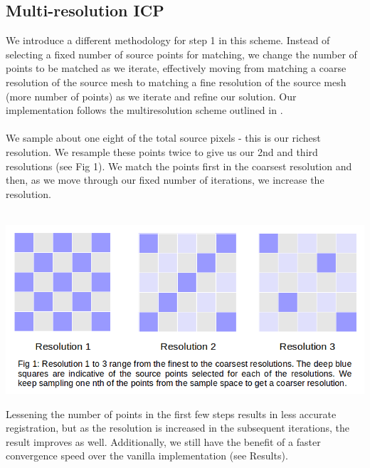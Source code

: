 \documentclass[a4paper,pagesize 10pt]{scrartcl}
\begin{document}
\subsection*{Multi-resolution ICP}
We introduce a different methodology for step 1 in this scheme. Instead of selecting a fixed number of source points for matching, we change the number of points to be matched as we iterate, effectively moving from matching a coarse resolution of the source mesh to matching a fine resolution of the source mesh (more number of points) as we iterate and refine our solution. Our implementation follows the multiresolution scheme outlined in \cite{H}. \\\\
We sample about one eight of the total source pixels - this is our richest resolution. We resample these points twice to give us our 2nd and third resolutions (see Fig 1). We match the points first in the coarsest resolution and then, as we move through our fixed number of iterations, we increase the resolution. \\\\
\begin{center}
    \includegraphics[scale=0.5]{MultiRes.png}
\end{center}
Lessening the number of points in the first few steps results in less accurate registration, but as the resolution is increased in the subsequent iterations, the result improves as well. Additionally, we still have the benefit of a faster convergence speed over the vanilla implementation (see Results).
\end{document}
